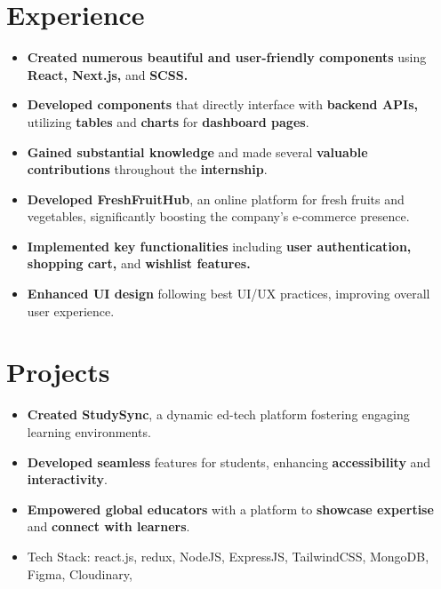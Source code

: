\documentclass[11pt,a4paper,sans]{moderncv}
\begin{document}
\section{Experience}
{
\begin{itemize}[leftmargin=0.6cm, label={\textbullet}]
    \item \textbf{Created numerous beautiful and user-friendly components} using \textbf{React, Next.js,} and \textbf{SCSS.}
    \item \textbf{Developed components} that directly interface with \textbf{backend APIs,} utilizing \textbf{tables} and \textbf{charts} for \textbf{dashboard pages}.
    \item \textbf{Gained substantial knowledge} and made several \textbf{valuable contributions} throughout the \textbf{internship}.
\end{itemize}
}

{
\begin{itemize}[leftmargin=0.6cm, label={\textbullet}]
    \item \textbf{Developed FreshFruitHub}, an online platform for fresh fruits and vegetables, significantly boosting the company’s e-commerce presence.
    \item \textbf{Implemented key functionalities} including \textbf{user authentication, shopping cart,} and \textbf{wishlist features.}
    \item \textbf{Enhanced UI design} following best UI/UX practices, improving overall user experience.
\end{itemize}
}

\section{Projects}
{
\begin{itemize}[leftmargin=0.6cm, label={\textbullet}]
    \item \textbf{Created StudySync}, a dynamic ed-tech platform fostering engaging learning environments.
    \item \textbf{Developed seamless} features for students, enhancing \textbf{accessibility} and \textbf{interactivity}.
    \item \textbf{Empowered global educators} with a platform to \textbf{showcase expertise} and \textbf{connect with learners}.
    \item Tech Stack: react.js, redux, NodeJS, ExpressJS, TailwindCSS, MongoDB, Figma, Cloudinary, 
\end{itemize}
}
\end{document}
